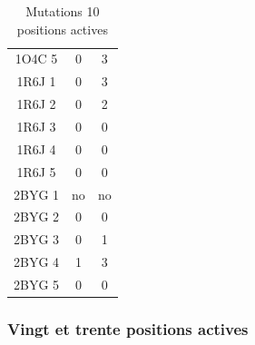 \documentclass[a4paper,12pt]{article}
\begin{document}
\begin{table}[h]
\begin{tabular}{|c|c|c|}
        1O4C 5 & 0  & 3 \\
        1R6J 1 & 0  & 3 \\
        1R6J 2 & 0  & 2 \\
        1R6J 3 & 0  & 0 \\
        1R6J 4 & 0  & 0 \\
        1R6J 5 & 0  & 0 \\
        2BYG 1 & no & no \\ 
        2BYG 2 & 0  & 0 \\
        2BYG 3 & 0  & 1 \\
        2BYG 4 & 1  & 3 \\
        2BYG 5 & 0  & 0 \\
        
        \hline

 \end{tabular}      
 \caption{Mutations 10 positions actives }
 \label{tab_echec2BYG__1}      
\end{table}





   \subsubsection{ Vingt et trente positions actives}
\end{document}
